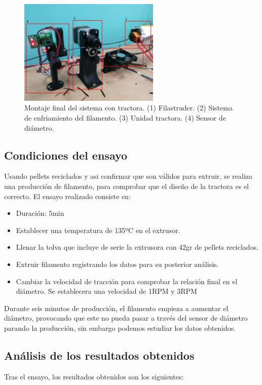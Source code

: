 \begin{figure}[H]
    \centering
    \includegraphics[width=0.6\textwidth]{images/producciones/tractora/IMG_20150709_130326.jpg}
    \caption[Montaje final del sistema con tractora.]{Montaje final del sistema con tractora. (1) Filastruder. (2) Sistema de enfriamiento del filamento. (3) Unidad tractora. (4) Sensor de diámetro.}
    \label{fig:montaje_final}
\end{figure}

\subsection{Condiciones del ensayo}

Usando pellets reciclados y asi confirmar que son válidos para extruir, se realiza una producción de filamento, para comprobar que el diseño de la tractora es el correcto. El ensayo realizado consiste en:

\begin{itemize}
    \item {Duración: 5min}
    \item{Establecer una temperatura de 135ºC en el extrusor.}
    \item{Llenar la tolva que incluye de serie la extrusora con 42gr de pellets reciclados.}
    \item{Extruir filamento registrando los datos para su posterior análisis.}
    \item{Cambiar la velocidad de tracción para comprobar la relación final en el diámetro. Se establecera una velocidad de 1RPM y 3RPM}
\end{itemize}

Durante seis minutos  de producción, el filamento empieza a aumentar el diámetro, provocando que este no pueda pasar a través del sensor de diámetro parando la producción, sin embargo podemos estudiar los datos obtenidos.


\subsection{Análisis de los resultados obtenidos}
Tras el ensayo, los resultados obtenidos son los siguientes:

